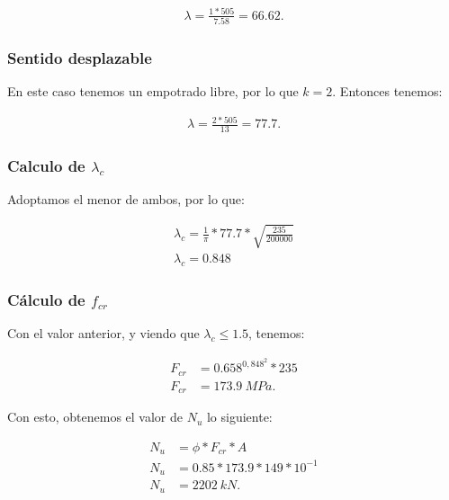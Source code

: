 \documentclass[../main.tex]{subfiles}
\begin{document}
\begin{align*}
  \lambda = \frac{1*505}{7.58} = 66.62
.\end{align*}

\subsubsection{Sentido desplazable}

En este caso tenemos un empotrado libre, por lo que $k=2$. Entonces tenemos:

\begin{align*}
  \lambda = \frac{2*505}{13} = 77.7
.\end{align*}


\subsubsection{Calculo de $\lambda_c$}

Adoptamos el menor de ambos, por lo que:

\begin{align*}
  \lambda_c = \frac{1}{\pi} * 77.7 * \sqrt{\frac{235}{200000}} \\[5pt]
  \lambda_c = 0.848
\end{align*}

\subsubsection{Cálculo de $f_{cr}$}

Con el valor anterior, y viendo que $\lambda_c \leq 1.5$, tenemos:

\begin{align*}
  F_{cr} &= 0.658^{0,848^{2}}*235 \\[5pt]
  F_{cr} &= \SI{173.9}{MPa}
.\end{align*}

Con esto, obtenemos el valor de $N_u$ lo siguiente:

\begin{align*}
  N_u &= \phi * F_{cr} * A  \\[5pt]
  N_u &= 0.85 * 173.9 * 149 * 10^{-1} \\[5pt]
  N_u &= \SI{2202}{kN}
.\end{align*}
\end{document}
